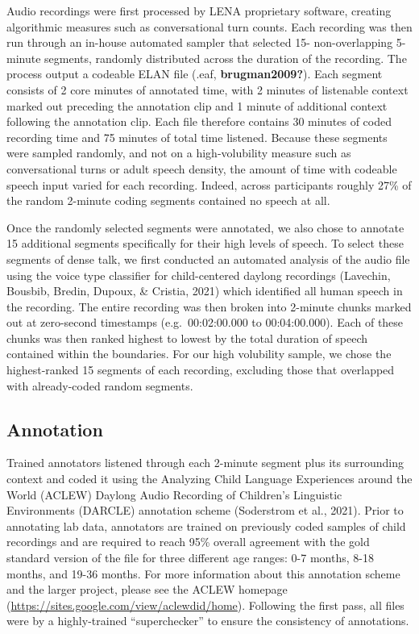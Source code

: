 \documentclass[
  man,floatsintext]{apa6}
\begin{document}
Audio recordings were first processed by LENA proprietary software, creating algorithmic measures such as conversational turn counts. Each recording was then run through an in-house automated sampler that selected 15- non-overlapping 5-minute segments, randomly distributed across the duration of the recording. The process output a codeable ELAN file (.eaf, \textbf{brugman2009?}). Each segment consists of 2 core minutes of annotated time, with 2 minutes of listenable context marked out preceding the annotation clip and 1 minute of additional context following the annotation clip. Each file therefore contains 30 minutes of coded recording time and 75 minutes of total time listened. Because these segments were sampled randomly, and not on a high-volubility measure such as conversational turns or adult speech density, the amount of time with codeable speech input varied for each recording. Indeed, across participants roughly 27\% of the random 2-minute coding segments contained no speech at all.

Once the randomly selected segments were annotated, we also chose to annotate 15 additional segments specifically for their high levels of speech. To select these segments of dense talk, we first conducted an automated analysis of the audio file using the voice type classifier for child-centered daylong recordings (Lavechin, Bousbib, Bredin, Dupoux, \& Cristia, 2021) which identified all human speech in the recording. The entire recording was then broken into 2-minute chunks marked out at zero-second timestamps (e.g.~00:02:00.000 to 00:04:00.000). Each of these chunks was then ranked highest to lowest by the total duration of speech contained within the boundaries. For our high volubility sample, we chose the highest-ranked 15 segments of each recording, excluding those that overlapped with already-coded random segments.

\hypertarget{annotation}{%
\subsection{Annotation}\label{annotation}}

Trained annotators listened through each 2-minute segment plus its surrounding context and coded it using the Analyzing Child Language Experiences around the World (ACLEW) Daylong Audio Recording of Children's Linguistic Environments (DARCLE) annotation scheme (Soderstrom et al., 2021). Prior to annotating lab data, annotators are trained on previously coded samples of child recordings and are required to reach 95\% overall agreement with the gold standard version of the file for three different age ranges: 0-7 months, 8-18 months, and 19-36 months. For more information about this annotation scheme and the larger project, please see the ACLEW homepage (\url{https://sites.google.com/view/aclewdid/home}). Following the first pass, all files were by a highly-trained ``superchecker'' to ensure the consistency of annotations.
\end{document}

